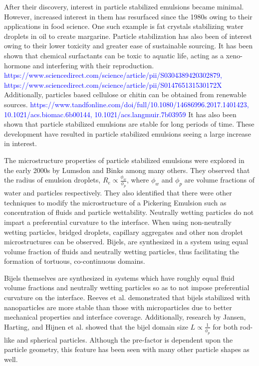 After their discovery, interest in particle stabilized emulsions became minimal. However, increased interest in them has resurfaced since the 1980s owing to their applications in food science. One such example is fat crystals stabilizing water droplets in oil to create margarine. Particle stabilization has also been of interest owing to their lower toxicity and greater ease of sustainable sourcing.
It has been shown that chemical surfactants can be toxic to aquatic life, acting as a xeno-hormone and interfering with their reproduction. \textcolor{blue}{https://www.sciencedirect.com/science/article/pii/S0304389420302879, https://www.sciencedirect.com/science/article/pii/S014765131530172X} Additionally, particles based cellulose or chitin can be obtained from renewable sources. \textcolor{blue}{https://www.tandfonline.com/doi/full/10.1080/14686996.2017.1401423, 10.1021/acs.biomac.6b00144, 10.1021/acs.langmuir.7b03959} It has also been shown that particle stabilized emulsions are stable for long periods of time. These development have resulted in particle stabilized emulsions seeing a large increase in interest. 

The microstructure properties of particle stabilized emulsions were explored in the early 2000s by Lumsdon and Binks among many others. They observed that the radius of emulsion droplets, $R_e \propto \frac{\phi_w}{\phi_p}$, where $\phi_w$ and $\phi_p$ are volume fractions of water and particles respectively. \cite{binks_pickering_2001} They also identified that there were other techniques to modify the microstructure of a Pickering Emulsion such as concentration of fluids and particle wettability. Neutrally wetting particles do not impart a preferential curvature to the interface. When using non-neutrally wetting particles, bridged droplets, capillary aggregates and other non droplet microstructures can be observed. Bijels, are synthesized in a system using equal volume fraction of fluids and neutrally wetting particles, thus facilitating the formation of tortuous, co-continuous domains. 

Bijels themselves are synthesized in systems which have roughly equal fluid volume fractions and neutrally wetting particles so as to not impose preferential curvature on the interface. \cite{stratford_colloidal_2005, herzig_bicontinuous_2007, lee_bicontinuous_2010, jansen_bijels_2011, velankar_non-equilibrium_2015} Reeves et al. demonstrated that bijels stabilized with nanoparticles are more stable than those with microparticles due to better mechanical properties and interface coverage. \cite{reeves_particle-size_2015}  Additionally, research by Jansen, Harting, and Hijnen et al. showed that the bijel domain size $L \propto \frac{1}{\phi_p}$ for both rod-like and spherical particles. Although the pre-factor is dependent upon the particle geometry, this feature has been seen with many other particle shapes as well. \cite{hijnen_bijels_2015, madivala_exploiting_2009, gunther_timescales_2014, daware_emulsions_2015, loudet_capillary_2005, cheng_shape-anisotropic_2013}

